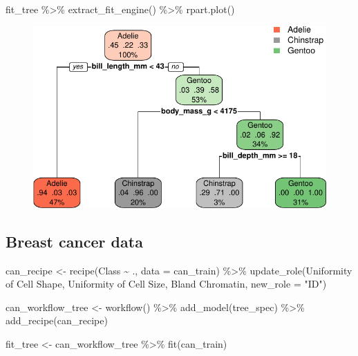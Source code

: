 \documentclass[
  letterpaper,
  DIV=11,
  numbers=noendperiod]{scrreprt}
\newenvironment{Shaded}{\begin{snugshade}}{\end{snugshade}}
\newcommand{\AttributeTok}[1]{\textcolor[rgb]{0.40,0.45,0.13}{#1}}
\newcommand{\FunctionTok}[1]{\textcolor[rgb]{0.28,0.35,0.67}{#1}}
\newcommand{\NormalTok}[1]{\textcolor[rgb]{0.00,0.23,0.31}{#1}}
\newcommand{\OtherTok}[1]{\textcolor[rgb]{0.00,0.23,0.31}{#1}}
\newcommand{\SpecialCharTok}[1]{\textcolor[rgb]{0.37,0.37,0.37}{#1}}
\newcommand{\StringTok}[1]{\textcolor[rgb]{0.13,0.47,0.30}{#1}}
\begin{document}
\begin{Shaded}
\begin{Highlighting}[]
\NormalTok{fit\_tree }\SpecialCharTok{\%\textgreater{}\%}
  \FunctionTok{extract\_fit\_engine}\NormalTok{() }\SpecialCharTok{\%\textgreater{}\%}
  \FunctionTok{rpart.plot}\NormalTok{()}
\end{Highlighting}
\end{Shaded}

\begin{figure}[H]

{\centering \includegraphics{./14-machine-learning_files/figure-pdf/unnamed-chunk-10-1.pdf}

}

\end{figure}

\hypertarget{breast-cancer-data-1}{%
\subsection{Breast cancer data}\label{breast-cancer-data-1}}

\begin{Shaded}
\begin{Highlighting}[]
\NormalTok{can\_recipe }\OtherTok{\textless{}{-}} 
  \FunctionTok{recipe}\NormalTok{(Class }\SpecialCharTok{\textasciitilde{}}\NormalTok{ ., }\AttributeTok{data =}\NormalTok{ can\_train) }\SpecialCharTok{\%\textgreater{}\%} 
  \FunctionTok{update\_role}\NormalTok{(}\StringTok{\textasciigrave{}}\AttributeTok{Uniformity of Cell Shape}\StringTok{\textasciigrave{}}\NormalTok{,  }\StringTok{\textasciigrave{}}\AttributeTok{Uniformity of Cell Size}\StringTok{\textasciigrave{}}\NormalTok{, }\StringTok{\textasciigrave{}}\AttributeTok{Bland Chromatin}\StringTok{\textasciigrave{}}\NormalTok{, }\AttributeTok{new\_role =} \StringTok{"ID"}\NormalTok{)}
  

\NormalTok{can\_workflow\_tree }\OtherTok{\textless{}{-}} \FunctionTok{workflow}\NormalTok{() }\SpecialCharTok{\%\textgreater{}\%}
  \FunctionTok{add\_model}\NormalTok{(tree\_spec) }\SpecialCharTok{\%\textgreater{}\%}
  \FunctionTok{add\_recipe}\NormalTok{(can\_recipe)}

\NormalTok{fit\_tree }\OtherTok{\textless{}{-}}\NormalTok{ can\_workflow\_tree }\SpecialCharTok{\%\textgreater{}\%} \FunctionTok{fit}\NormalTok{(can\_train)}
\end{Highlighting}
\end{Shaded}
\end{document}

